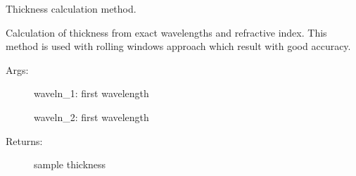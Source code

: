\documentclass[letterpaper,10pt,english]{sphinxmanual}
\begin{document}

\begin{fulllineitems}
\label{\detokenize{GUI:GUI.adv_dist_calc}}
Thickness calculation method.

Calculation of thickness from exact wavelengths and refractive index. This
method is used with rolling windows approach which result with good accuracy.
\begin{description}
\item[{Args:}] \leavevmode
waveln\_1: first wavelength

waveln\_2: first wavelength

\item[{Returns:}] \leavevmode
sample thickness

\end{description}

\end{fulllineitems}

\end{document}
